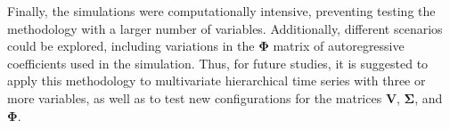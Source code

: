 \documentclass[a4paper,preprint,11pt,authoryear]{elsarticle}
\begin{document}
Finally, the simulations were computationally intensive, preventing testing the methodology with a larger number of variables. Additionally, different scenarios could be explored, including variations in the $\bm{\Phi}$ matrix of autoregressive coefficients used in the simulation. Thus, for future studies, it is suggested to apply this methodology to multivariate hierarchical time series with three or more variables, as well as to test new configurations for the matrices $\bm{V}$, $\bm{\Sigma}$, and $\bm{\Phi}$.



\end{document}
